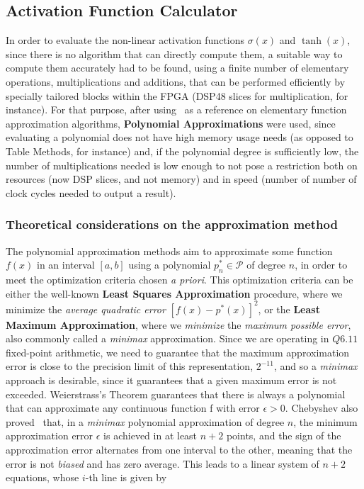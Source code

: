 \subsection{Activation Function Calculator}\label{sec:nonlincalc}
In order to evaluate the non-linear activation functions $\sigma(x)$ and $\tanh(x)$, since there is no algorithm that can directly compute them,
a suitable way to compute them accurately had to be found, using a finite number of elementary operations, multiplications and additions, that can be performed
efficiently by specially tailored blocks within the FPGA (DSP48 slices for multiplication, for instance). For that purpose, after using~\cite{Muller05} as a
reference on elementary function approximation algorithms, \textbf{Polynomial Approximations} were used, since evaluating a polynomial does not have high memory usage
needs (as opposed to Table Methods, for instance) and, if the polynomial degree is sufficiently low, the number of multiplications needed is low enough to not pose a restriction
both on resources (now DSP slices, and not memory) and in speed (number of number of clock cycles needed to output a result).

\subsubsection{Theoretical considerations on the approximation method}
The polynomial approximation methods aim to approximate some function $f(x)$ in an interval $\left[a, b\right]$ using a polynomial $p^*_n \in \mathcal{P}$ of
degree $n$, in order to meet the optimization criteria chosen \textit{a priori}. This optimization criteria can be either the
well-known \textbf{Least Squares Approximation} procedure, where we minimize the \emph{average quadratic error} $\left[f(x)-p^*(x)\right]^2$, or
the \textbf{Least Maximum Approximation}, where we \emph{minimize} the \emph{maximum possible error}, also commonly called a \textit{minimax} approximation.
Since we are operating in $Q6.11$ fixed-point arithmetic, we need to guarantee that the maximum approximation error is close to the precision limit of this
representation, $2^{-11}$, and so a \textit{minimax} approach is desirable, since it guarantees that a given maximum error is not exceeded. Weierstrass's
Theorem guarantees that there is always a polynomial that can approximate any continuous function f with error $\epsilon > 0$.
Chebyshev also proved~\cite{Muller05} that, in a \textit{minimax} polynomial approximation of degree $n$, the minimum approximation error $\epsilon$ is achieved in
at least $n+2$ points, and the sign of the approximation error alternates from one interval to the other, meaning that the error is not \emph{biased} and has zero average.
This leads to a linear system of $n+2$ equations, whose $i$-th line is given by

